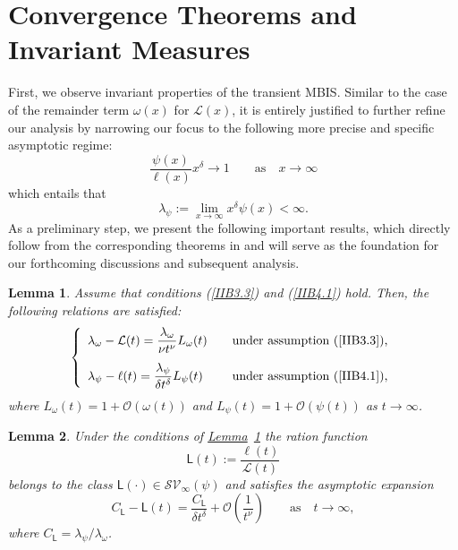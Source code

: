 \documentclass[10pt,reqno]{amsart}
\newtheorem{lemma}{Lemma}
\theoremstyle{definition}
\numberwithin{equation}{section}
\begin{document}
\section{\textbf{Convergence Theorems and Invariant Measures}}             \label{IIBSec4}

    First, we observe invariant properties of the transient MBIS. Similar to the case of the
    remainder term $\omega(x)$ for $\mathcal{L}(x)$, it is entirely justified to further refine
    our analysis by narrowing our focus to the following more precise and specific asymptotic regime:
\[
    \frac{\psi(x)}{\ell(x)}{x^{\delta}}\to{1} \qquad {\text{as}} \quad {x\to\infty}
\]
    which entails that
\begin{equation}                \label{IIB4.1}
    {{\lambda}_{\psi}}:=\lim_{x\to\infty }{x^{\delta}}\psi(x)<\infty.
\end{equation}
    As a preliminary step, we present the following important results, which directly follow from the corresponding
    theorems in {\cite{ImMDPI24}} and will serve as the foundation for our forthcoming discussions and subsequent analysis.

\begin{lemma}                   \label{IIBLem4}
    Assume that conditions {(\ref{IIB3.3})} and {(\ref{IIB4.1})} hold. Then, the following relations are satisfied:
\begin{align}                \label{IIB4.2}
\left\{
\begin{array}{l}
    \displaystyle{{\lambda}_{\omega}}-\mathcal{L}(t)=\frac{{{\lambda}_{\omega}}}{\nu{t^{\nu}}}{L_{\omega}}(t)
    \qquad \hfill {\text{under assumption {(\ref{IIB3.3})},}}
\vspace{2.8mm}  \\
    \displaystyle{{\lambda}_{\psi}}-\ell(t)=\frac{{{\lambda}_{\psi}}}{\delta{t^{\delta}}}{L_{\psi}}(t)
    \qquad \hfill {\text{under assumption {(\ref{IIB4.1})},}}  \\
\end{array}
\right.
\end{align}
    where ${{L}_{\omega}}(t)=1+\mathcal{O}(\omega(t))$ and ${{L}_{\psi}}(t)=1+\mathcal{O}(\psi(t))$ as $t\to\infty$.
\end{lemma}

\begin{lemma}                   \label{IIBLem5}
    Under the conditions of {\hyperref[IIBLem4]{Lemma}~\ref{IIBLem4}} the ration function
\[
    \textsf{L}(t):=\frac{\ell(t)}{\mathcal{L}(t)}
\]
    belongs to the class $\textsf{L}(\cdot)\in{{\mathcal{SV}}_{\infty}}(\psi)$ and  satisfies the asymptotic expansion
\begin{equation}                \label{IIB4.3}
    {C_{\textsf{L}}}-{\textsf{L}}(t)=\frac{{C_{\textsf{L}}}}{\delta{t^{\delta}}}+\mathcal{O}\left(\frac{1}{t^{\nu}}\right)
    \qquad {\text{as}} \quad {t\to\infty},
\end{equation}
    where ${C_{\textsf{L}}}={{\lambda}_{\psi}}\big/{{\lambda}_{\omega}}$.
\end{lemma}
\end{document}
